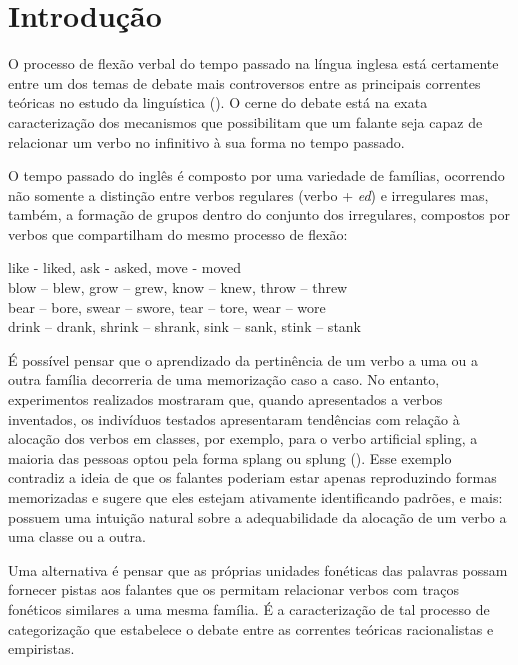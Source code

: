 \chapter{Introdução}
\label{ch:01}

O processo de flexão verbal do tempo passado na língua inglesa está certamente entre um dos temas de debate mais controversos entre as principais correntes teóricas no estudo da linguística (\cite{chomsky:1968,Pinker:1988,rumelhart:1986}). O cerne do debate está na exata caracterização dos mecanismos que possibilitam que um falante seja capaz de relacionar um verbo no infinitivo à sua forma no tempo passado. 

O tempo passado do inglês é composto por uma variedade de famílias, ocorrendo não somente a distinção entre verbos regulares (verbo + \textit{ed}) e irregulares mas, também, a formação de grupos dentro do conjunto dos irregulares, compostos por verbos que compartilham do mesmo processo de flexão:

\begin{center}
like - liked, ask - asked, move - moved\\
blow – blew, grow – grew, know – knew, throw – threw\\
bear – bore, swear – swore, tear – tore, wear – wore\\
drink – drank, shrink – shrank, sink – sank, stink – stank \\
\end{center}

É possível pensar que o aprendizado da pertinência de um verbo a uma ou a outra família decorreria de uma memorização caso a caso. No entanto, experimentos realizados mostraram que, quando apresentados a verbos inventados, os indivíduos testados apresentaram tendências com relação à alocação dos verbos em classes, por exemplo, para o verbo artificial spling, a maioria das pessoas optou pela forma splang  ou splung (\cite{Bybee:1983}). Esse exemplo contradiz a ideia de que os falantes poderiam estar apenas reproduzindo formas memorizadas e sugere que eles estejam ativamente identificando padrões, e mais: possuem uma intuição natural sobre a adequabilidade da alocação de um verbo a uma classe ou a outra.

Uma alternativa é pensar que as próprias unidades fonéticas das palavras possam fornecer pistas aos falantes que os permitam relacionar verbos com traços fonéticos similares a uma mesma família. É a caracterização de tal processo de categorização que estabelece o debate entre as correntes teóricas racionalistas e empiristas.  

